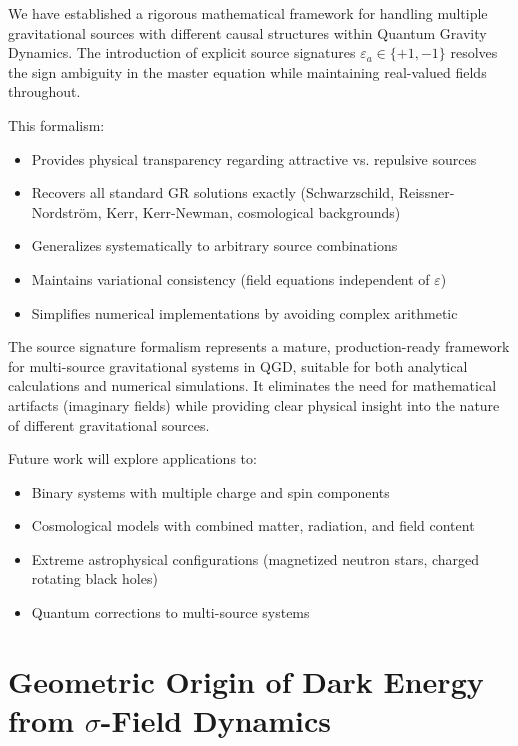 \documentclass[11pt,a4paper]{article}
\theoremstyle{definition}
\theoremstyle{remark}
\begin{document}
	We have established a rigorous mathematical framework for handling multiple gravitational sources with different causal structures within Quantum Gravity Dynamics. The introduction of explicit source signatures $\varepsilon_a \in \{+1,-1\}$ resolves the sign ambiguity in the master equation while maintaining real-valued fields throughout.
	
	This formalism:
	\begin{itemize}
		\item Provides physical transparency regarding attractive vs. repulsive sources
		\item Recovers all standard GR solutions exactly (Schwarzschild, Reissner-Nordström, Kerr, Kerr-Newman, cosmological backgrounds)
		\item Generalizes systematically to arbitrary source combinations
		\item Maintains variational consistency (field equations independent of $\varepsilon$)
		\item Simplifies numerical implementations by avoiding complex arithmetic
	\end{itemize}
	
	The source signature formalism represents a mature, production-ready framework for multi-source gravitational systems in QGD, suitable for both analytical calculations and numerical simulations. It eliminates the need for mathematical artifacts (imaginary fields) while providing clear physical insight into the nature of different gravitational sources.
	
	Future work will explore applications to:
	\begin{itemize}
		\item Binary systems with multiple charge and spin components
		\item Cosmological models with combined matter, radiation, and field content
		\item Extreme astrophysical configurations (magnetized neutron stars, charged rotating black holes)
		\item Quantum corrections to multi-source systems
	\end{itemize}
	
	\section{Geometric Origin of Dark Energy from $\sigma$-Field Dynamics}
	
\end{document}
